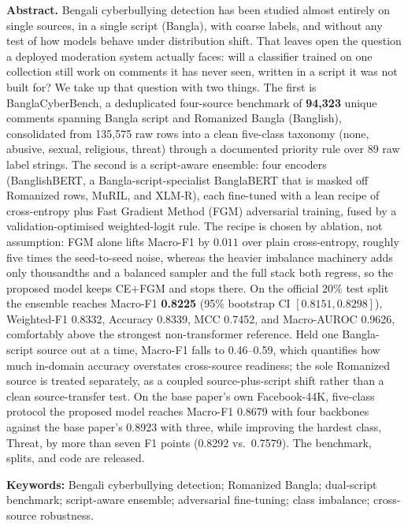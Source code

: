 \documentclass[11pt,a4paper]{article}
\def\emph#1{#1}%
\newcommand{\bench}{BanglaCyberBench}
\begin{document}
\begin{journalabstract}
\noindent\textbf{Abstract.\;}%
Bengali cyberbullying detection has been studied almost entirely on single sources, in a single script (Bangla), with coarse labels, and without any test of how models behave under distribution shift. That leaves open the question a deployed moderation system actually faces: will a classifier trained on one collection still work on comments it has never seen, written in a script it was not built for? We take up that question with two things. The first is \bench{}, a deduplicated four-source benchmark of \textbf{94{,}323} unique comments spanning Bangla script and Romanized Bangla (\emph{Banglish}), consolidated from 135{,}575 raw rows into a clean five-class taxonomy (\emph{none, abusive, sexual, religious, threat}) through a documented priority rule over 89 raw label strings. The second is a script-aware ensemble: four encoders (BanglishBERT, a Bangla-script-specialist BanglaBERT that is masked off Romanized rows, MuRIL, and XLM-R), each fine-tuned with a lean recipe of cross-entropy plus Fast Gradient Method (FGM) adversarial training, fused by a validation-optimised weighted-logit rule. The recipe is chosen by ablation, not assumption: FGM alone lifts Macro-F1 by $0.011$ over plain cross-entropy, roughly five times the seed-to-seed noise, whereas the heavier imbalance machinery adds only thousandths and a balanced sampler and the full stack both regress, so the proposed model keeps CE$+$FGM and stops there. On the official 20\% test split the ensemble reaches Macro-F1 \textbf{0.8225} (95\% bootstrap CI $[0.8151, 0.8298]$), Weighted-F1 0.8332, Accuracy 0.8339, MCC 0.7452, and Macro-AUROC 0.9626, comfortably above the strongest non-transformer reference. Held one Bangla-script source out at a time, Macro-F1 falls to 0.46--0.59, which quantifies how much in-domain accuracy overstates cross-source readiness; the sole Romanized source is treated separately, as a coupled source-plus-script shift rather than a clean source-transfer test. On the base paper's own Facebook-44K, five-class protocol the proposed model reaches Macro-F1 0.8679 with four backbones against the base paper's 0.8923 with three, while improving the hardest class, \emph{Threat}, by more than seven F1 points (0.8292 vs.\ 0.7579). The benchmark, splits, and code are released.

\vspace{4pt}
\noindent\textbf{Keywords:}\; Bengali cyberbullying detection;\; Romanized Bangla;\; dual-script benchmark;\; script-aware ensemble;\; adversarial fine-tuning;\; class imbalance;\; cross-source robustness.
\end{journalabstract}
\end{document}
